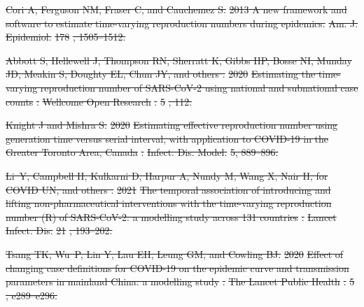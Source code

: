 \documentclass[12pt]{article}
\providecommand{\DIFdeltex}[1]{{\protect\color{red}\sout{#1}}}                      %
\providecommand{\DIFdel}[1]{\texorpdfstring{\DIFdeltex{#1}}{}} %
\begin{document}
\DIFdel{Cori A, Ferguson NM, Fraser C, and Cauchemez S.
}%
\DIFdel{2013 A new framework and software to estimate time-varying
  reproduction numbers during epidemics.
}%
\DIFdel{Am. J. Epidemiol.}%
\DIFdel{178}%
\DIFdel{, 1505--1512.
}%

\DIFdel{Abbott S, Hellewell J, Thompson RN, Sherratt K, Gibbs HP, Bosse NI, Munday JD,
  Meakin S, Doughty EL, Chun JY, and others .
}%
\DIFdel{2020 }%
\DIFdel{Estimating the time-varying reproduction number of SARS-CoV-2
  using national and subnational case counts}%
\DIFdel{.
}%
\DIFdel{Wellcome Open Research}%
\DIFdel{.
}%
\DIFdel{5}%
\DIFdel{, 112.
}%

\DIFdel{Knight J and Mishra S.
}%
\DIFdel{2020 }%
\DIFdel{Estimating effective reproduction number using generation time
  versus serial interval, with application to COVID-19 in the Greater Toronto
  Area, Canada}%
\DIFdel{.
}%
\DIFdel{Infect. Dis. Model.}%
\DIFdel{5, 889--896.
}%

\DIFdel{Li~Y, Campbell H, Kulkarni D, Harpur A, Nundy M, Wang X, Nair H, for COVID UN,
  and others .
}%
\DIFdel{2021 }%
\DIFdel{The temporal association of introducing and lifting
  non-pharmaceutical interventions with the time-varying reproduction number
  (R) of SARS-CoV-2: a modelling study across 131 countries}%
\DIFdel{.
}%
\DIFdel{Lancet Infect. Dis.}%
\DIFdel{21}%
\DIFdel{, 193--202.
}%

\DIFdel{Tsang TK, Wu~P, Lin Y, Lau EH, Leung GM, and Cowling BJ.
}%
\DIFdel{2020 }%
\DIFdel{Effect of changing case definitions for COVID-19 on the
  epidemic curve and transmission parameters in mainland China: a modelling
  study}%
\DIFdel{.
}%
\DIFdel{The Lancet Public Health}%
\DIFdel{.
}%
\DIFdel{5}%
\DIFdel{, e289--e296.
}%
\end{document}

